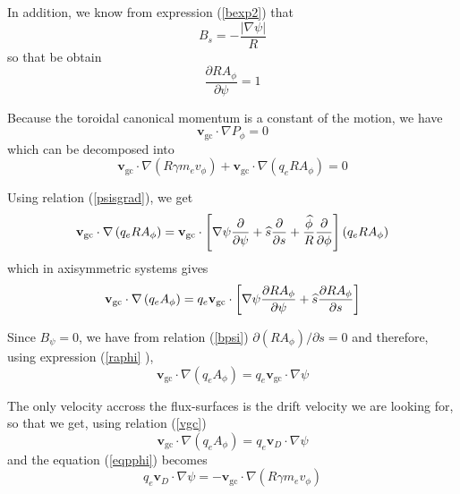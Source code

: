 In addition, we know from expression (\ref{bexp2}) that
\begin{equation}
B_{s}=-\frac{\left| \nabla \psi \right| }{R}
\end{equation}
so that be obtain
\begin{equation}
\frac{\partial RA_{\phi }}{\partial \psi }=1  \label{raphi}
\end{equation}

Because the toroidal canonical momentum is a constant of the motion, we have
\thinspace
\begin{equation}
\mathbf{v}_{\text{gc}}\cdot \nabla P_{\phi }=0
\end{equation}
which can be decomposed into
\begin{equation}
\mathbf{v}_{\text{gc}}\cdot \nabla \left( R\gamma m_{e}v_{\phi }\right) +%
\mathbf{v}_{\text{gc}}\cdot \nabla \left( q_{e}RA_{\phi }\right) =0
\label{eqpphi}
\end{equation}

Using relation (\ref{psisgrad}), we get
\begin{equation}
\mathbf{v}_{\text{gc}}\cdot \nabla \left( q_{e}RA_{\phi }\right) =\mathbf{v}%
_{\text{gc}}\cdot \left[ \nabla \psi \frac{\partial }{\partial \psi }+%
\widehat{s}\frac{\partial }{\partial s}+\frac{\widehat{\phi }}{R}\frac{%
\partial }{\partial \phi }\right] \left( q_{e}RA_{\phi }\right)
\end{equation}
which in axisymmetric systems gives
\begin{equation}
\mathbf{v}_{\text{gc}}\cdot \nabla \left( q_{e}A_{\phi }\right) =q_{e}%
\mathbf{v}_{\text{gc}}\cdot \left[ \nabla \psi \frac{\partial RA_{\phi }}{%
\partial \psi }+\widehat{s}\frac{\partial RA_{\phi }}{\partial s}\right]
\end{equation}

Since $B_{\psi }=0$, we have from relation (\ref{bpsi}) $\partial \left(
RA_{\phi }\right) /\partial s=0$ and therefore, using expression (\ref{raphi}%
),
\begin{equation}
\mathbf{v}_{\text{gc}}\cdot \nabla \left( q_{e}A_{\phi }\right) =q_{e}\mathbf{v}%
_{\text{gc}}\cdot \nabla \psi
\end{equation}

The only velocity accross the flux-surfaces is the drift velocity we are
looking for, so that we get, using relation (\ref{vgc})
\begin{equation}
\mathbf{v}_{\text{gc}}\cdot \nabla \left( q_{e}A_{\phi }\right) =q_{e}\mathbf{v}%
_{D}\cdot \nabla \psi
\end{equation}
and the equation (\ref{eqpphi}) becomes
\begin{equation}
q_{e}\mathbf{v}_{D}\cdot \nabla \psi =-\mathbf{v}_{\text{gc}}\cdot \nabla
\left( R\gamma m_{e}v_{\phi }\right)
\end{equation}

